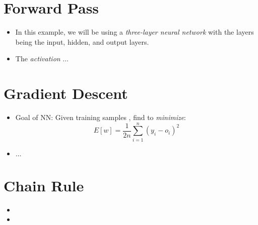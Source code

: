 \documentclass[
	number={8},
	title={Artificial Neural Network}
]{cs584notes}
\begin{document}
\section{Forward Pass}\label{sec:forward-pass}
\begin{itemize}
	\item In this example, we will be using a \emph{three-layer neural network} with the layers being the input, hidden, and output layers.
	\item The \emph{activation} $\dots$
\end{itemize}

\section{Gradient Descent}\label{sec:gradient-descent-review}
\begin{itemize}
	\item Goal of NN: Given  training samples , find  to \emph{minimize}:
	\begin{equation}
		E[w] = \frac{1}{2n} \sum_{i=1}^{n} (y_{i} - o_{i})^{2}
		\label{eq:gradient-descent-review}
	\end{equation}
	\item $\dots$
\end{itemize}

\section{Chain Rule}\label{sec:chain-rule}
\begin{itemize}
	\item {}
	\item {}
\end{itemize}
\end{document}
